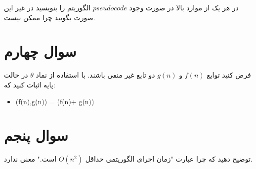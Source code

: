 \documentclass[12pt]{article}
\begin{document}
در هر یک از موارد بالا در صورت وجود $pseudocode$ الگوریتم را بنویسید در غیر این صورت بگویید چرا ممکن نیست.







\section{سوال چهارم}
فرض کنید توابع $f(n)$ و $g(n)$ دو تابع غیر منفی باشند. با استفاده از نماد $\theta$ در حالت پایه اثبات کنید که:

\begin{itemize}
          \item \max(f(n),g(n)) = \Theta(f(n)+ g(n))
\end{itemize}

\section{سوال پنجم}
توضیح دهید که چرا عبارت "زمان اجرای الگوریتمی حداقل $O(n^2)$ است." معنی ندارد.
\end{document}
